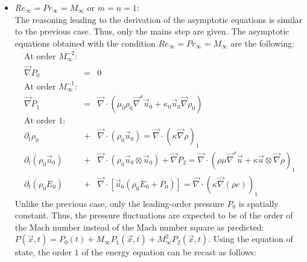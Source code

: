 \documentclass[preprint,10pt]{elsarticle}
\renewcommand{\div}{\vec{\nabla}\! \cdot \!}
\newcommand{\grad}{\vec{\nabla}}
\newcommand{\eqt}[1]{Eq.~(\ref{#1})}                     %
\newcommand{\sct}[1]{Section~\ref{#1}}                   %
\begin{document}
\begin{itemize}
\begin{equation}
\label{eq:norm_relation}
\mu_{\infty} = \frac{ \rho_{\infty} c_{\infty}^2 u_{\infty} L }{ n_{P,\infty} } 
\end{equation}
where $n_{P,\infty}$ is the far-field quantity for the normalization parameter $n_P$. Substituing \eqt{eq:norm_relation} into \eqt{eq:ref_numb} and remembering that the numerical Reynolds number scales as one by assumption, it yields:
\begin{equation}
\label{eq:norm_relation_bis}
n_{P,\infty} = \rho_{\infty} c_{\infty}^2
\end{equation}
\eqt{eq:norm_relation_bis} tells us that in the asymptotic limit, the normalization parameter $n_P$ scales as $\rho_{\infty} c_{\infty}^2$ which leaves us with two options:
either $n_P = \rho c^2$ or $n_P = P$. The choice was made to use $n_P = \rho c^2$ in the low Mach asymptotic limit: it was found to behave well and the pressure can become locally negative and null in some particular case as shown in \sct{sec:results}.
\item $Re_{\infty} = Pr_{\infty} = M_{\infty}$ or $m=n=1$:\\
The reasoning leading to the derivation of the asymptotic equations is similar to the previous case. Thus, only the mains step are given. The asymptotic equations obtained with the condition $Re_{\infty} = Pr_{\infty} = M_{\infty}$ are the following:
 \begin{eqnarray}\label{eq:asympt_equ2}
 \text{At order $M_{\infty}^{-2}$:} && \nonumber\\
 \grad P_0 &=& 0  \nonumber\\
 \text{At order $M_{\infty}^{-1}$:} && \nonumber\\
 \grad P_1 &=& \div (\mu_0 \rho_0 \grad^s \vec{u}_0 + \kappa_0 \vec{u}_0 \grad \rho_0 ) \nonumber \\
 \text{At order $1$:} && \nonumber\\
 \partial_t \rho_0 &+& \div ( \rho_0 \vec{u}_0 ) = \div ( \kappa \grad \rho )_1 \nonumber \\
 \partial_t (\rho_0 \vec{u}_0) &+& \div ( \rho_0 \vec{u}_0 \otimes \vec{u}_0) + \grad P_2 = \div (\rho \mu \grad^s \vec{u} +\kappa \vec{u} \otimes \grad \rho )_1 \nonumber \\
 \partial_t(\rho_0 E_0) &+& \div \left[ \vec{u}_0 (\rho_0 E_0 + P_0) \right] = \div(\kappa \grad(\rho e))_1 \nonumber
 \end{eqnarray}
Unlike the previous case, only the leading-order pressure $P_0$ is spatially constant. Thus, the pressure fluctuations are expected to be of the order of the Mach number instead of the Mach number square as predicted: $P(\vec{x},t) = P_0(t) + M_{\infty} P_1(\vec{x},t)  + M_{\infty}^2 P_2(\vec{x},t)$. Using the equation of state, the order $1$ of the energy equation can be recast as follows:

\end{itemize}
\end{document}
